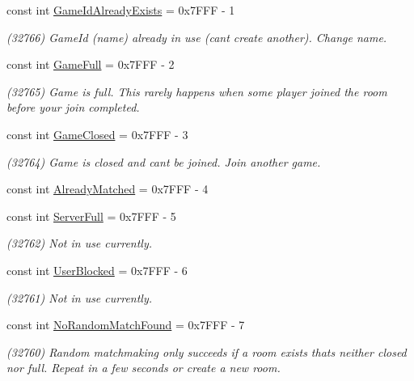 \begin{DoxyCompactItemize}
const int \hyperlink{class_exit_games_1_1_client_1_1_photon_1_1_error_code_a2898552672360480d562a6f9958790d9}{Game\+Id\+Already\+Exists} = 0x7\+F\+F\+F -\/ 1
\begin{DoxyCompactList}\small\item\em (32766) Game\+Id (name) already in use (can\textquotesingle{}t create another). Change name.\end{DoxyCompactList}\item 
const int \hyperlink{class_exit_games_1_1_client_1_1_photon_1_1_error_code_ae558d99e91f22c6e7c54a6b07f299a8a}{Game\+Full} = 0x7\+F\+F\+F -\/ 2
\begin{DoxyCompactList}\small\item\em (32765) Game is full. This rarely happens when some player joined the room before your join completed.\end{DoxyCompactList}\item 
const int \hyperlink{class_exit_games_1_1_client_1_1_photon_1_1_error_code_ae684a99ed82da84e00412c0e24c37dd7}{Game\+Closed} = 0x7\+F\+F\+F -\/ 3
\begin{DoxyCompactList}\small\item\em (32764) Game is closed and can\textquotesingle{}t be joined. Join another game.\end{DoxyCompactList}\item 
const int \hyperlink{class_exit_games_1_1_client_1_1_photon_1_1_error_code_a434e3c23f618eaad22e1ef1b99c47042}{Already\+Matched} = 0x7\+F\+F\+F -\/ 4
\item 
const int \hyperlink{class_exit_games_1_1_client_1_1_photon_1_1_error_code_ab8516a7e5eb0152044f8befd5cc583c4}{Server\+Full} = 0x7\+F\+F\+F -\/ 5
\begin{DoxyCompactList}\small\item\em (32762) Not in use currently.\end{DoxyCompactList}\item 
const int \hyperlink{class_exit_games_1_1_client_1_1_photon_1_1_error_code_af82f564f81d5a4c27f09fe60c7854fc5}{User\+Blocked} = 0x7\+F\+F\+F -\/ 6
\begin{DoxyCompactList}\small\item\em (32761) Not in use currently.\end{DoxyCompactList}\item 
const int \hyperlink{class_exit_games_1_1_client_1_1_photon_1_1_error_code_ab72bc9e6c9cb2af830c33d613ddc2b6f}{No\+Random\+Match\+Found} = 0x7\+F\+F\+F -\/ 7
\begin{DoxyCompactList}\small\item\em (32760) Random matchmaking only succeeds if a room exists thats neither closed nor full. Repeat in a few seconds or create a new room.\end{DoxyCompactList}\item 

\end{DoxyCompactItemize}
